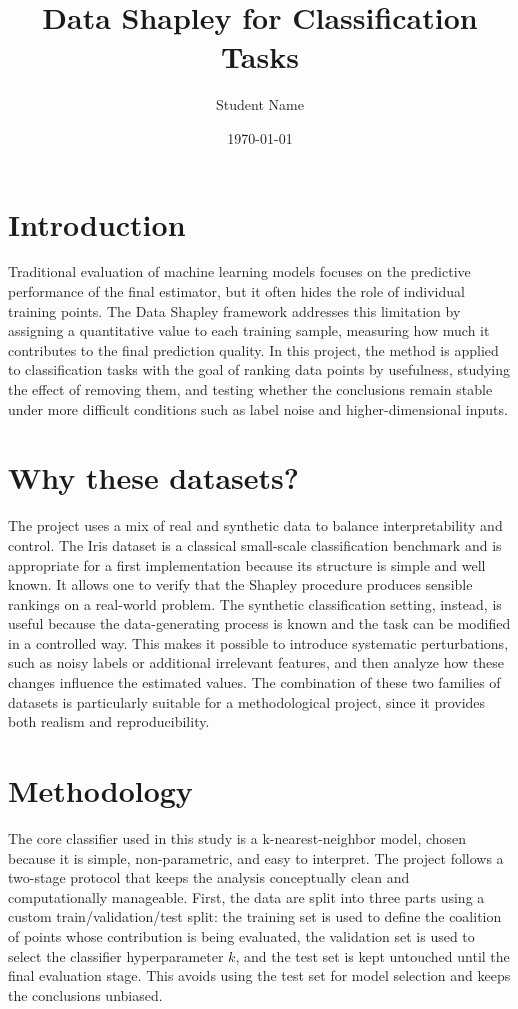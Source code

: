 \documentclass[11pt]{article}
\title{Data Shapley for Classification Tasks}
\author{Student Name}
\date{\today}
\begin{document}
\maketitle

\section{Introduction}
Traditional evaluation of machine learning models focuses on the predictive performance of the final estimator, but it often hides the role of individual training points. The Data Shapley framework addresses this limitation by assigning a quantitative value to each training sample, measuring how much it contributes to the final prediction quality. In this project, the method is applied to classification tasks with the goal of ranking data points by usefulness, studying the effect of removing them, and testing whether the conclusions remain stable under more difficult conditions such as label noise and higher-dimensional inputs.

\section{Why these datasets?}
The project uses a mix of real and synthetic data to balance interpretability and control. The Iris dataset is a classical small-scale classification benchmark and is appropriate for a first implementation because its structure is simple and well known. It allows one to verify that the Shapley procedure produces sensible rankings on a real-world problem. The synthetic classification setting, instead, is useful because the data-generating process is known and the task can be modified in a controlled way. This makes it possible to introduce systematic perturbations, such as noisy labels or additional irrelevant features, and then analyze how these changes influence the estimated values. The combination of these two families of datasets is particularly suitable for a methodological project, since it provides both realism and reproducibility.

\section{Methodology}
The core classifier used in this study is a k-nearest-neighbor model, chosen because it is simple, non-parametric, and easy to interpret. The project follows a two-stage protocol that keeps the analysis conceptually clean and computationally manageable. First, the data are split into three parts using a custom train/validation/test split: the training set is used to define the coalition of points whose contribution is being evaluated, the validation set is used to select the classifier hyperparameter $k$, and the test set is kept untouched until the final evaluation stage. This avoids using the test set for model selection and keeps the conclusions unbiased.
\end{document}

